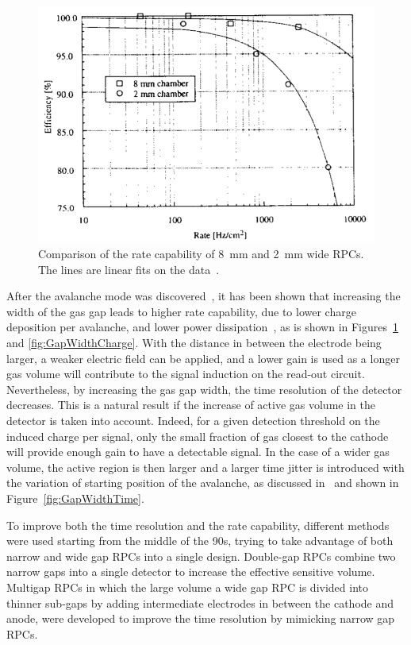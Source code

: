 	\begin{figure}
		\centering
		\includegraphics[width = \linewidth]{fig/chapt3/Gap-width-rate-cap.png}
		\caption{\label{fig:GapWidthRate} Comparison of the rate capability of \SI{8}{mm} and \SI{2}{mm} wide RPCs. The lines are linear fits on the data~\cite{ZEBALLOS96COMP}.}
	\end{figure}
	
	After the avalanche mode was discovered~\cite{CROTTY93}, it has been shown that increasing the width of the gas gap leads to higher rate capability, due to lower charge deposition per avalanche, and lower power dissipation~\cite{ZEBALLOS96COMP}, as is shown in Figures~\ref{fig:GapWidthRate} and \ref{fig:GapWidthCharge}. With the distance in between the electrode being larger, a weaker electric field can be applied, and a lower gain is used as a longer gas volume will contribute to the signal induction on the read-out circuit. Nevertheless, by increasing the gas gap width, the time resolution of the detector decreases. This is a natural result if the increase of active gas volume in the detector is taken into account. Indeed, for a given detection threshold on the induced charge per signal, only the small fraction of gas closest to the cathode will provide enough gain to have a detectable signal. In the case of a wider gas volume, the active region is then larger and a larger time jitter is introduced with the variation of starting position of the avalanche, as discussed in~\cite{ZEBALLOS96MRPC} and shown in Figure~\ref{fig:GapWidthTime}.
	
	To improve both the time resolution and the rate capability, different methods were used starting from the middle of the 90s, trying to take advantage of both narrow and wide gap RPCs into a single design. Double-gap RPCs combine two narrow gaps into a single detector to increase the effective sensitive volume. Multigap RPCs in which the large volume a wide gap RPC is divided into thinner sub-gaps by adding intermediate electrodes in between the cathode and anode, were developed to improve the time resolution by mimicking narrow gap RPCs.
	
